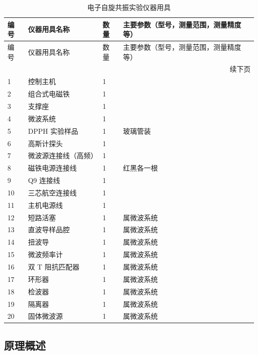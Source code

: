 \documentclass[dvipsnames, svgnames,a4paper,11pt]{article}
\begin{document}
\begin{longtable}[htbp]{p{}|p{}|p{}|p{}}
	\caption{电子自旋共振实验仪器用具} \label{tbl:电子自旋共振实验仪器用具} \\
	\hline
	编号 & 仪器用具名称 & 数量 & 主要参数（型号，测量范围，测量精度等） \\
	\hline
	\endfirsthead
	
	\hline
	编号 & 仪器用具名称 & 数量 & 主要参数（型号，测量范围，测量精度等） \\
	\hline
	\endhead
	
	\hline
	\multicolumn{4}{r}{续下页} \\
	\hline
	\endfoot
	
	\hline
	\endlastfoot
	
	1 & 控制主机 & 1 &  \\
	2 & 组合式电磁铁 & 1 &  \\
	3 & 支撑座 & 1 &  \\
	4 & 微波系统 & 1 &  \\
	5 & DPPH 实验样品 & 1 & 玻璃管装 \\
	6 & 高斯计探头 & 1 &  \\
	7 & 微波源连接线（高频） & 1 &  \\
	8 & 磁铁电源连接线 & 1 & 红黑各一根 \\
	9 & Q9 连接线 & 1 &  \\
	10 & 三芯航空连接线 & 1 &  \\
	11 & 主机电源线 & 1 &  \\
	12 & 短路活塞 & 1 & 属微波系统 \\
	13 & 直波导样品腔 & 1 & 属微波系统 \\
	14 & 扭波导 & 1 & 属微波系统 \\
	15 & 微波频率计 & 1 & 属微波系统 \\
	16 & 双 T 阻抗匹配器 & 1 & 属微波系统 \\
	17 & 环形器 & 1 & 属微波系统 \\
	18 & 检波器 & 1 & 属微波系统 \\
	19 & 隔离器 & 1 & 属微波系统 \\
	20 & 固体微波源 & 1 & 属微波系统 \\
	
\end{longtable}




\clearpage

\subsection{原理概述}
\end{document}
